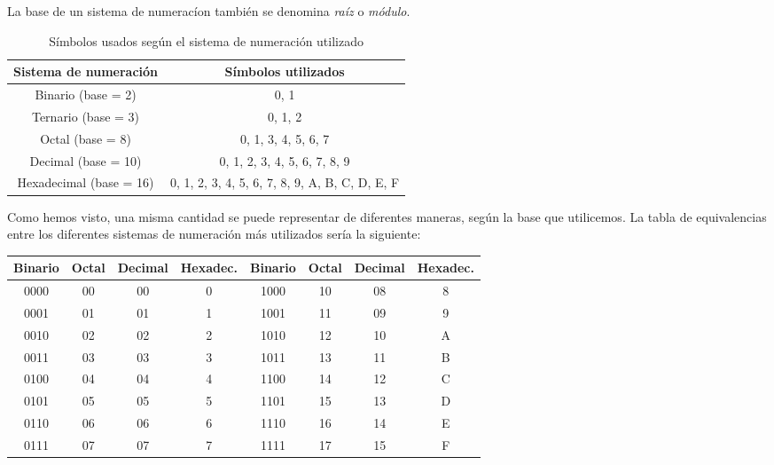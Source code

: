 \documentclass[12pt]{article}
\begin{document}
			La base de un sistema de numeracíon también se denomina \textit{raíz} o \textit{módulo}.\\
			
			\begin{table}[H]
				\centering
				\begin{tabular}{c|c}
					Sistema de numeración & Símbolos utilizados\\
					\midrule
					Binario (base = 2) & 0, 1\\
					Ternario (base = 3) & 0, 1, 2\\
					Octal (base = 8) & 0, 1, 3, 4, 5, 6, 7\\
					Decimal (base = 10) & 0, 1, 2, 3, 4, 5, 6, 7, 8, 9\\
					Hexadecimal (base = 16) & 0, 1, 2, 3, 4, 5, 6, 7, 8, 9, A, B, C, D, E, F\\
				\end{tabular}
				\caption{Símbolos usados según el sistema de numeración utilizado}
			\end{table}
			
			Como hemos visto, una misma cantidad se puede representar de diferentes maneras, según la base que utilicemos. La tabla de equivalencias entre los diferentes sistemas de numeración más utilizados sería la siguiente:\\
			
			\begin{table}[H]
				\centering
				\label{table:con}
				\begin{tabular}{c|c|c|c||c|c|c|c}
					Binario & Octal & Decimal & Hexadec. & Binario & Octal & Decimal & Hexadec. \\
					\toprule
					0000 & 00 & 00 & 0 & 1000 & 10 & 08 & 8 \\
					0001 & 01 & 01 & 1 & 1001 & 11 & 09 & 9 \\
					0010 & 02 & 02 & 2 & 1010 & 12 & 10 & A \\
					0011 & 03 & 03 & 3 & 1011 & 13 & 11 & B \\
					0100 & 04 & 04 & 4 & 1100 & 14 & 12 & C \\
					0101 & 05 & 05 & 5 & 1101 & 15 & 13 & D \\
					0110 & 06 & 06 & 6 &1110 & 16 & 14 & E \\
					0111 & 07 & 07 & 7 & 1111 & 17 & 15 & F \\
					\bottomrule					
				\end{tabular}
			\end{table}
			
\end{document}
